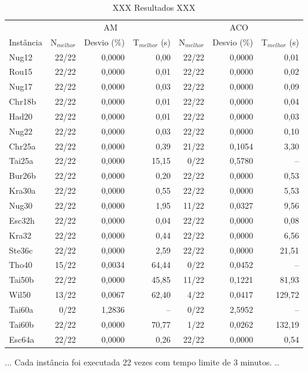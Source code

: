 \begin{table}[H]
  \caption{XXX Resultados XXX}
  \centering
  \begin{tabular}{l r r r r r r}
    \toprule
    & \multicolumn{3}{c}{AM} & \multicolumn{3}{c}{ACO} \\
    \cmidrule(r){2-4} \cmidrule(r){5-7}
    Instância & N$_{melhor}$ & Desvio (\%) & T$_{melhor}$ (s) & N$_{melhor}$
    & Desvio (\%) & T$_{melhor}$ (s)\\
    \midrule
    Nug12 & 22/22 & 0,0000 & 0,00 & 22/22 & 0,0000 & 0,01 \\
    Rou15 & 22/22 & 0,0000 & 0,01 & 22/22 & 0,0000 & 0,02 \\
    Nug17 & 22/22 & 0,0000 & 0,03 & 22/22 & 0,0000 & 0,09 \\
    Chr18b & 22/22 & 0,0000 & 0,01 & 22/22 & 0,0000 & 0,04 \\
    Had20 & 22/22 & 0,0000 & 0,01 & 22/22 & 0,0000 & 0,03 \\
    Nug22 & 22/22 & 0,0000 & 0,03 & 22/22 & 0,0000 & 0,10 \\
    Chr25a & 22/22 & 0,0000 & 0,39 & 21/22 & 0,1054 & 3,30 \\
    Tai25a & 22/22 & 0,0000 & 15,15 & 0/22 & 0,5780 & -- \\
    Bur26b & 22/22 & 0,0000 & 0,20 & 22/22 & 0,0000 & 0,53 \\
    Kra30a & 22/22 & 0,0000 & 0,55 & 22/22 & 0,0000 & 5,53 \\
    Nug30 & 22/22 & 0,0000 & 1,95 & 11/22 & 0,0327 & 9,56 \\
    Esc32h & 22/22 & 0,0000 & 0,04 & 22/22 & 0,0000 & 0,08 \\
    Kra32 & 22/22 & 0,0000 & 0,44 & 22/22 & 0,0000 & 6,56 \\
    Ste36c & 22/22 & 0,0000 & 2,59 & 22/22 & 0,0000 & 21,51 \\
    Tho40 & 15/22 & 0,0034 & 64,44 & 0/22 & 0,0452 & -- \\
    Tai50b & 22/22 & 0,0000 & 45,85 & 11/22 & 0,1221 & 81,93 \\
    Wil50 & 13/22 & 0,0067 & 62,40 & 4/22 & 0,0417 & 129,72 \\
    Tai60a & 0/22 & 1,2836 & -- & 0/22 & 2,5952 & -- \\
    Tai60b & 22/22 & 0,0000 & 70,77 & 1/22 & 0,0262 & 132,19 \\
    Esc64a & 22/22 & 0,0000 & 0,26 & 22/22 & 0,0000 & 0,54 \\
    \bottomrule
  \end{tabular}
\end{table}

...
Cada instância foi executada 22 vezes com tempo limite de 3 minutos.
..
